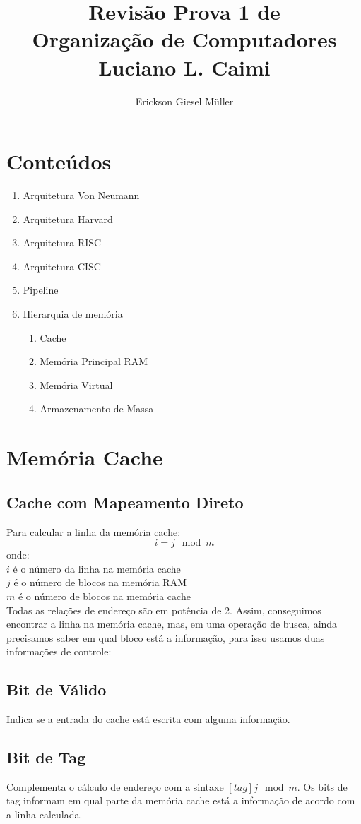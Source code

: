 \documentclass{article}
\title{Revisão Prova 1 de\\Organização de Computadores\\Luciano L. Caimi}
\author{Erickson Giesel Müller}
\date{}
\begin{document}
	\maketitle
	\section*{Conteúdos}
		\begin{enumerate}
			\item Arquitetura Von Neumann
			\item Arquitetura Harvard
			\item Arquitetura RISC
			\item Arquitetura CISC
			
			\item Pipeline
			\item Hierarquia de memória
				\begin{enumerate}
				 	\item Cache
				 	\item Memória Principal RAM
				 	\item Memória Virtual
				 	\item Armazenamento de Massa
				\end{enumerate}
		\end{enumerate}
		
	\section{Memória Cache}
		\subsection{Cache com Mapeamento Direto}
			Para calcular a linha da memória cache:
			$$i = j \mod m$$
			onde:\\
			$i$ é o número da linha na memória cache\\
			$j$ é o número de blocos na memória RAM\\
			$m$ é o número de blocos na memória cache\\
			Todas as relações de endereço são em potência de 2. Assim, conseguimos encontrar a linha na memória cache, mas, em uma operação de busca, ainda precisamos saber em qual \underline{bloco} está a informação, para isso usamos duas informações de controle:			
		\subsection{Bit de Válido}
			Indica se a entrada do cache está escrita com alguma informação.
		\subsection{Bit de Tag}
			Complementa o cálculo de endereço com a sintaxe $[tag]j \mod m$. Os bits de tag informam em qual parte da memória cache está a informação de acordo com a linha calculada.
\end{document}
